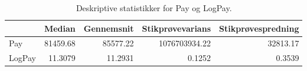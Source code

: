 \begin{table}[H]
\centering
\begin{tabular}{lrrrr}
\toprule
 & Median & Gennemsnit & Stikprøvevarians & Stikprøvespredning \\
\midrule
Pay & 81459.68 & 85577.22 & 1076703934.22 & 32813.17 \\
LogPay & 11.3079 & 11.2931 & 0.1252 & 0.3539 \\
\bottomrule
\end{tabular}
\caption{Deskriptive statistikker for Pay og LogPay.}
\label{tab:descriptive}
\end{table}

